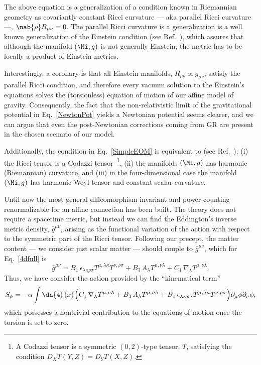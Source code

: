 \documentclass[aps,prl,twocolumn,superscriptaddress,showpacs,showkeys]{revtex4-1}
\begin{document}
The above equation is a generalization of a condition known in Riemannian geometry as covariantly constant Ricci curvature --- aka parallel Ricci curvature ---, \mbox{$\nab{\rho} R_{\mu\nu} = 0$.} The parallel Ricci curvature is a generalization is a well known generalization of the Einstein condition (see Ref.~\cite{Besse,MO-Bryant}), which assures that although the manifold $(\Mi,g)$ is not generally Einstein, the metric has to be locally a product of Einstein metrics.

Interestingly, a corollary is that all Einstein manifolds, \mbox{$R_{\mu\nu} \propto g_{\mu\nu}$,} satisfy the parallel Ricci condition, and therefore every vacuum solution to the Einstein's equations solves the (torsionless) equation of motion of our affine model of gravity. Consequently, the fact that the non-relativistic limit of the gravitational potential in Eq.~\eqref{NewtonPot} yields a Newtonian potential seems clearer, and we can argue that even the post-Newtonian corrections coming from GR are present in the chosen scenario of our model.

Additionally, the condition in Eq.~\eqref{SimpleEOM} is equivalent to (see Ref.~\cite{Besse}): (i) the Ricci tensor is a Codazzi tensor~\footnote{A Codazzi tensor is a symmetric $(0,2)$-type tensor, $T$, satisfying the condition \mbox{$D_X T(Y,Z) = D_Y T(X,Z)$.}}, (ii) the manifolds $(\Mi,g)$ has harmonic (Riemannian) curvature, and (iii) in the four-dimensional case the manifold $(\Mi,g)$ has harmonic Weyl tensor and constant scalar curvature.

Until now the most general diffeomorphism invariant and power-counting renormalizable for an affine connection has been built. The theory does not require a spacetime metric, but instead we can find the Eddington's inverse metric density, $\bar{g}^{\mu\nu}$, arising as the functional variation of the action with respect to the symmetric part of the Ricci tensor. Following our precept, the matter content --- we consider just scalar matter --- should couple to $\bar{g}^{\mu\nu}$, which for Eq.~\eqref{4dfull} is
\begin{dmath}
  \bar{g}^{\mu\nu} = B_1\, \epsilon_{\lambda\kappa\rho\sigma} T^{\mu, \lambda\kappa} T^{\nu, \rho\sigma} + B_3\, A_\lambda T^{\mu,\nu\lambda} + C_1\, \nabla_\lambda T^{\mu,\nu\lambda}.
\end{dmath}
Thus, we have consider the action provided by the ``kinematical term''
\begin{dmath}
  \label{ScalarAction}
  S_\phi = - \alpha \int \dn{4}{x} \Big( C_1\, \nabla_\lambda T^{\mu,\nu\lambda}  + B_3\, A_\lambda T^{\mu,\nu\lambda} + B_1\, \epsilon_{\lambda\kappa\rho\sigma} T^{\mu, \lambda\kappa} T^{\nu, \rho\sigma} \Big) \partial_\mu\phi\partial_\nu\phi,
\end{dmath}
which possesses a nontrivial contribution to the equations of motion once the torsion is set to zero.
\end{document}

